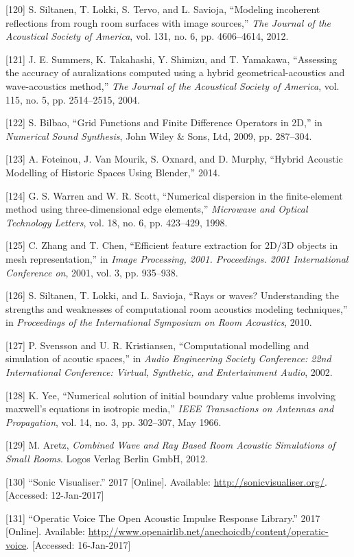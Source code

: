 \documentclass[]{scrreprt}
\begin{document}
\hypertarget{ref-siltanenux5fmodelingux5f2012}{}
{[}120{]} S. Siltanen, T. Lokki, S. Tervo, and L. Savioja, ``Modeling
incoherent reflections from rough room surfaces with image sources,''
\emph{The Journal of the Acoustical Society of America}, vol. 131, no.
6, pp. 4606--4614, 2012.

\hypertarget{ref-summersux5fassessingux5f2004}{}
{[}121{]} J. E. Summers, K. Takahashi, Y. Shimizu, and T. Yamakawa,
``Assessing the accuracy of auralizations computed using a hybrid
geometrical-acoustics and wave-acoustics method,'' \emph{The Journal of
the Acoustical Society of America}, vol. 115, no. 5, pp. 2514--2515,
2004.

\hypertarget{ref-bilbaoux5fgridux5f2009}{}
{[}122{]} S. Bilbao, ``Grid Functions and Finite Difference Operators in
2D,'' in \emph{Numerical Sound Synthesis}, John Wiley \& Sons, Ltd,
2009, pp. 287--304.

\hypertarget{ref-foteinouux5fhybridux5f2014}{}
{[}123{]} A. Foteinou, J. Van Mourik, S. Oxnard, and D. Murphy, ``Hybrid
Acoustic Modelling of Historic Spaces Using Blender,'' 2014.

\hypertarget{ref-warrenux5fnumericalux5f1998}{}
{[}124{]} G. S. Warren and W. R. Scott, ``Numerical dispersion in the
finite-element method using three-dimensional edge elements,''
\emph{Microwave and Optical Technology Letters}, vol. 18, no. 6, pp.
423--429, 1998.

\hypertarget{ref-zhangux5fefficientux5f2001}{}
{[}125{]} C. Zhang and T. Chen, ``Efficient feature extraction for 2D/3D
objects in mesh representation,'' in \emph{Image Processing, 2001.
Proceedings. 2001 International Conference on}, 2001, vol. 3, pp.
935--938.

\hypertarget{ref-siltanenux5fraysux5f2010}{}
{[}126{]} S. Siltanen, T. Lokki, and L. Savioja, ``Rays or waves?
Understanding the strengths and weaknesses of computational room
acoustics modeling techniques,'' in \emph{Proceedings of the
International Symposium on Room Acoustics}, 2010.

\hypertarget{ref-svenssonux5fcomputationalux5f2002}{}
{[}127{]} P. Svensson and U. R. Kristiansen, ``Computational modelling
and simulation of acoutic spaces,'' in \emph{Audio Engineering Society
Conference: 22nd International Conference: Virtual, Synthetic, and
Entertainment Audio}, 2002.

\hypertarget{ref-yeeux5fnumericalux5f1966}{}
{[}128{]} K. Yee, ``Numerical solution of initial boundary value
problems involving maxwell's equations in isotropic media,'' \emph{IEEE
Transactions on Antennas and Propagation}, vol. 14, no. 3, pp. 302--307,
May 1966.

\hypertarget{ref-aretzux5fcombinedux5f2012}{}
{[}129{]} M. Aretz, \emph{Combined Wave and Ray Based Room Acoustic
Simulations of Small Rooms}. Logos Verlag Berlin GmbH, 2012.

\hypertarget{ref-ux5fsonicux5f2017}{}
{[}130{]} ``Sonic Visualiser.'' 2017 {[}Online{]}. Available:
\url{http://sonicvisualiser.org/}. {[}Accessed: 12-Jan-2017{]}

\hypertarget{ref-ux5foperaticux5f2017}{}
{[}131{]} ``Operatic Voice The Open Acoustic Impulse Response Library.''
2017 {[}Online{]}. Available:
\url{http://www.openairlib.net/anechoicdb/content/operatic-voice}.
{[}Accessed: 16-Jan-2017{]}
\end{document}
